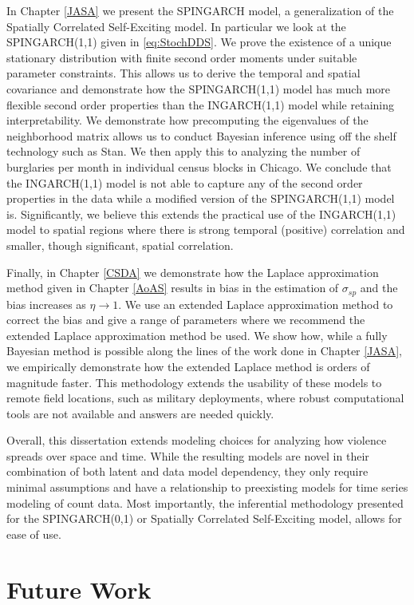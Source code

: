 \documentclass[11pt]{isuthesis}
\begin{document}
	In Chapter \ref{JASA} we present the SPINGARCH model, a generalization of the Spatially Correlated Self-Exciting model.  In particular we look at the SPINGARCH(1,1) given in \eqref{eq:StochDDS}.  We prove the existence of a unique stationary distribution with finite second order moments under suitable parameter constraints.  This allows us to derive the temporal and spatial covariance and demonstrate how the SPINGARCH(1,1) model has much more flexible second order properties than the INGARCH(1,1) model while retaining interpretability.  We demonstrate how precomputing the eigenvalues of the neighborhood matrix allows us to conduct Bayesian inference using off the shelf technology such as Stan.  We then apply this to analyzing the number of burglaries per month in individual census blocks in Chicago.  We conclude that the INGARCH(1,1) model is not able to capture any of the second order properties in the data while a modified version of the SPINGARCH(1,1) model is.  Significantly, we believe this extends the practical use of the INGARCH(1,1) model to spatial regions where there is strong temporal (positive) correlation and smaller, though significant, spatial correlation.  
	
	Finally, in Chapter \ref{CSDA} we demonstrate how the Laplace approximation method given in Chapter \ref{AoAS} results in bias in the estimation of $\sigma_{sp}$ and the bias increases as $\eta \to 1$.  We use an extended Laplace approximation method to correct the bias and give a range of parameters where we recommend the extended Laplace approximation method be used.  We show how, while a fully Bayesian method is possible along the lines of the work done in Chapter \ref{JASA}, we empirically demonstrate how the extended Laplace method is orders of magnitude faster.  This methodology extends the usability of these models to remote field locations, such as military deployments, where robust computational tools are not available and answers are needed quickly.
	
	Overall, this dissertation extends modeling choices for analyzing how violence spreads over space and time.  While the resulting models are novel in their combination of both latent and data model dependency, they only require minimal assumptions and have a relationship to preexisting models for time series modeling of count data.  Most importantly, the inferential methodology presented for the SPINGARCH(0,1) or Spatially Correlated Self-Exciting model, allows for ease of use.
	
	\section{Future Work}
	
\end{document}
